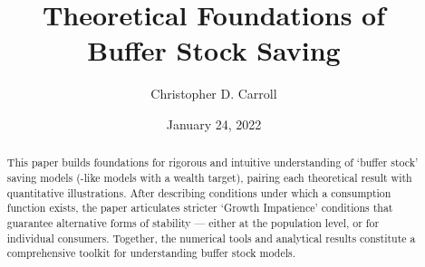 \documentclass[BufferStockTheory]{subfiles}
\providecommand{\versn}{pdf} %
\begin{document}
\ifthenelse{\boolean{Web}}{    %
  \renewcommand{\versn}{Web}     %
  \renewcommand{\rootFromOut}{.} %
}{}  %



\title{Theoretical Foundations of \\ Buffer Stock Saving}

\author{Christopher D. Carroll\authNum}



\renewcommand{\forcedate}{January 24, 2022}\date{\forcedate}

\maketitle
\hypertarget{abstract}{}
\begin{abstract}
  This paper builds foundations for rigorous and intuitive understanding of `buffer stock' saving models (\cite{bewleyPIH}-like models with a wealth target), pairing each theoretical result with quantitative illustrations.  After describing conditions under which a consumption function exists, the paper articulates stricter `Growth Impatience' conditions that guarantee alternative forms of stability --- either at the population level, or for individual consumers.  Together, the numerical tools and analytical results constitute a comprehensive toolkit for understanding buffer stock models.
\end{abstract}

\hypertarget{links}{}
\end{document}
